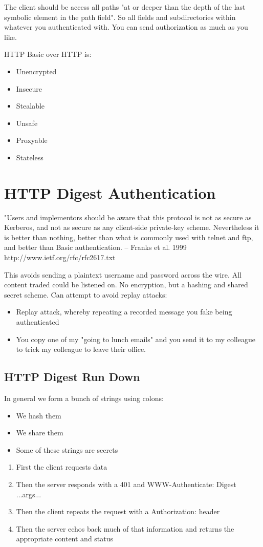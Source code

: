 \documentclass[../CMPUT-404-Notes.tex]{subfiles}
\begin{document}
The client should be access all paths "at or deeper than the depth of the last symbolic element in the path field". So all fields and subdirectories within whatever you authenticated with.
You can send authorization as much as you like.

HTTP Basic over HTTP is:
\begin{itemize}
  \item Unencrypted
  \item Insecure
  \item Stealable
  \item Unsafe
  \item Proxyable
  \item Stateless
\end{itemize}

\section{HTTP Digest Authentication}
\begin{DndReadAloud}[color=bgtan]
  "Users and implementors should be aware that
this protocol is not as secure as Kerberos, and
not as secure as any client-side private-key
scheme. Nevertheless it is better than nothing,
better than what is commonly used with telnet
and ftp, and better than Basic authentication.
-- Franks et al. 1999
http://www.ietf.org/rfc/rfc2617.txt
\end{DndReadAloud}

This avoids sending a plaintext username and password across the wire.
All content traded could be listened on.
No encryption, but a hashing and shared secret scheme.
Can attempt to avoid replay attacks:
\begin{itemize}
  \item Replay attack, whereby repeating a recorded message you fake being authenticated
  \item You copy one of my "going to lunch emails" and you send it to my colleague to trick my colleague to leave their office.
\end{itemize}

\subsection{HTTP Digest Run Down}
In general we form a bunch of strings using colons:
\begin{itemize}
  \item We hash them
  \item We share them
  \item Some of these strings are secrets
\end{itemize}
\begin{enumerate}
  \item First the client requests data
  \item Then the server responds with a 401 and WWW-Authenticate: Digest ...args...
  \item Then the client repeats the request with a Authorization: header
  \item Then the server echos back much of that information and returns the appropriate content and status
\end{enumerate}
\end{document}
